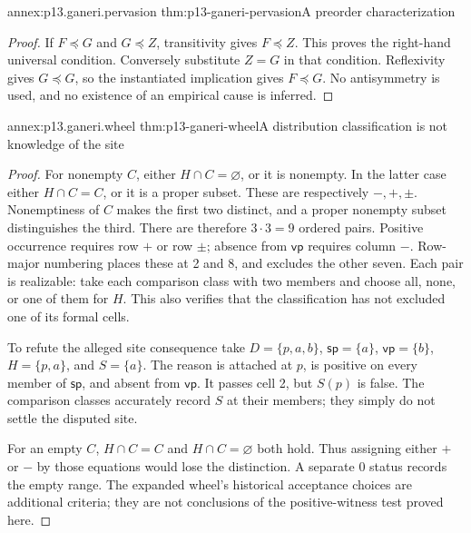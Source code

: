 \begin{annexitem}{annex:p13.ganeri.pervasion}
 {thm:p13-ganeri-pervasion}{A preorder characterization}
\begin{proof}
If \(F\preceq G\) and \(G\preceq Z\), transitivity gives
\(F\preceq Z\). This proves the right-hand universal condition.
Conversely substitute \(Z=G\) in that condition. Reflexivity gives
\(G\preceq G\), so the instantiated implication gives \(F\preceq G\).
No antisymmetry is used, and no existence of an empirical cause is inferred.
\end{proof}
\end{annexitem}

\begin{annexitem}{annex:p13.ganeri.wheel}
 {thm:p13-ganeri-wheel}{A distribution classification is not knowledge of the site}
\begin{proof}
For nonempty \(C\), either \(H\cap C=\varnothing\), or it is nonempty.
In the latter case either \(H\cap C=C\), or it is a proper subset.
These are respectively \(-,+,\pm\). Nonemptiness of \(C\) makes the
first two distinct, and a proper nonempty subset distinguishes the third.
There are therefore \(3\cdot3=9\) ordered pairs.
Positive occurrence requires row \(+\) or row \(\pm\); absence from
\(\mathsf{vp}\) requires column \(-\). Row-major numbering places
these at 2 and 8, and excludes the other seven.
Each pair is realizable: take each comparison class with two members
and choose all, none, or one of them for \(H\). This also verifies
that the classification has not excluded one of its formal cells.

To refute the alleged site consequence take
\(D=\{p,a,b\}\), \(\mathsf{sp}=\{a\}\), \(\mathsf{vp}=\{b\}\),
\(H=\{p,a\}\), and \(S=\{a\}\). The reason is attached at \(p\),
is positive on every member of \(\mathsf{sp}\), and absent from
\(\mathsf{vp}\). It passes cell 2, but \(S(p)\) is false.
The comparison classes accurately record \(S\) at their members;
they simply do not settle the disputed site.

For an empty \(C\), \(H\cap C=C\) and \(H\cap C=\varnothing\)
both hold. Thus assigning either \(+\) or \(-\) by those equations
would lose the distinction. A separate \(0\) status records the empty
range. The expanded wheel's historical acceptance choices are additional
criteria; they are not conclusions of the positive-witness test proved here.
\end{proof}
\end{annexitem}

